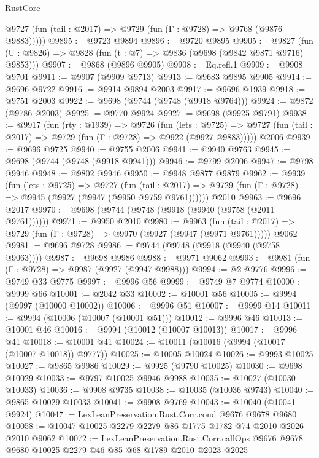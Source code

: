 \begin{lexlean}{RustCore}
\begin{coremodule}
      @9727 (fun (tail : @2017) => @9729 (fun (Γ : @9728) => @9768 (@9876 @9883)))))
@9895 := @9723 @9894
@9896 := @9720 @9895
@9905 := @9827 (fun (U : @9826) => @9828 (fun (t : @7) => @9836 (@9698 (@9842 @9871 @9716) @9853)))
@9907 := @9868 (@9896 @9905)
@9908 := Eq.refl.{1}
@9909 := @9908 @9701
@9911 := @9907 (@9909 @9713)
@9913 := @9683 @9895 @9905
@9914 := @9696 @9722
@9916 := @9914 @9894 @2003
@9917 := @9696 @1939
@9918 := @9751 @2003
@9922 := @9698 (@9744 (@9748 (@9918 @9764)))
@9924 := @9872 (@9786 @2003)
@9925 := @9770 @9924
@9927 := @9698 (@9925 @9791)
@9938 := @9917
    (fun (rty : @1939) =>
    @9726
      (fun (lets : @9725) =>
      @9727 (fun (tail : @2017) => @9729 (fun (Γ : @9728) => @9922 (@9927 @9883)))))
    @2006
@9939 := @9696 @9725
@9940 := @9755 @2006
@9941 := @9940 @9763
@9945 := @9698 (@9744 (@9748 (@9918 @9941)))
@9946 := @9799 @2006
@9947 := @9798 @9946
@9948 := @9802 @9946
@9950 := @9948 @9877 @9879
@9962 := @9939
    (fun (lets : @9725) =>
    @9727
      (fun (tail : @2017) => @9729 (fun (Γ : @9728) => @9945 (@9927 (@9947 (@9950 @9759 @9761))))))
    @2010
@9963 := @9696 @2017
@9970 := @9698 (@9744 (@9748 (@9918 (@9940 (@9758 (@2011 @9761))))))
@9971 := @9950 @2010
@9980 := @9963
    (fun (tail : @2017) => @9729 (fun (Γ : @9728) => @9970 (@9927 (@9947 (@9971 @9761)))))
    @9062
@9981 := @9696 @9728
@9986 := @9744 (@9748 (@9918 (@9940 (@9758 @9063))))
@9987 := @9698 @9986
@9988 := @9971 @9062
@9993 := @9981 (fun (Γ : @9728) => @9987 (@9927 (@9947 @9988)))
@9994 := @2 @9776
@9996 := @9749 @33 @9775
@9997 := @9996 @56
@9999 := @9749 @7 @9774
@10000 := @9999 @66
@10001 := @2042 @33
@10002 := @10001 @56
@10005 := @9994 (@9997 (@10000 @10002))
@10006 := @9996 @51
@10007 := @9999 @14
@10011 := @9994 (@10006 (@10007 (@10001 @51)))
@10012 := @9996 @46
@10013 := @10001 @46
@10016 := @9994 (@10012 (@10007 @10013))
@10017 := @9996 @41
@10018 := @10001 @41
@10024 := @10011 (@10016 (@9994 (@10017 (@10007 @10018)) @9777))
@10025 := @10005 @10024
@10026 := @9993 @10025
@10027 := @9865 @9986
@10029 := @9925 (@9790 @10025)
@10030 := @9698 @10029
@10033 := @9797 @10025 @9946 @9988
@10035 := @10027 (@10030 @10033)
@10036 := @9908 @9735
@10038 := @10035 (@10036 @9743)
@10040 := @9865 @10029 @10033
@10041 := @9908 @9769
@10043 := @10040 (@10041 @9924)
@10047 := LexLeanPreservation.Rust.Corr.cond @9676 @9678 @9680
@10058 := @10047 @10025 @2279 @2279 @86 @1775 @1782 @74 @2010 @2026 @2010 @9062
@10072 := LexLeanPreservation.Rust.Corr.callOps
    @9676
    @9678
    @9680
    @10025
    @2279
    @46
    @85
    @68
    @1789
    @2010
    @2023
    @2025

\end{coremodule}
\end{lexlean}
